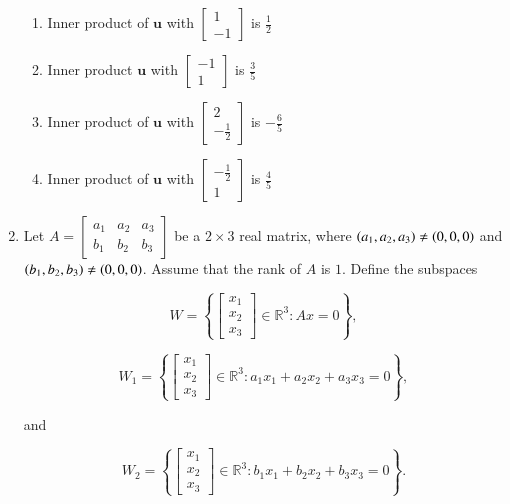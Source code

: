 \documentclass[journal]{IEEEtran}
\numberwithin{equation}{enumi}
\numberwithin{figure}{enumi}
\begin{document}
\begin{enumerate}
\begin{enumerate}[label=\brak{\Alph*}]
\item Inner product of $\mathbf{u}$ with $\begin{bmatrix} 1 \\ -1 \end{bmatrix}$ is $\frac{1}{2}$

\item Inner product $\mathbf{u}$ with $\begin{bmatrix} -1 \\ 1 \end{bmatrix}$ is $\frac{3}{5}$ 

\item Inner product of $\mathbf{u}$ with $\begin{bmatrix} 2 \\ -\frac{1}{2} \end{bmatrix}$ is $-\frac{6}{5}$

\item Inner product of $\mathbf{u}$ with $\begin{bmatrix} -\frac{1}{2} \\ 1 \end{bmatrix}$ is $\frac{4}{5}$
\end{enumerate}

\item Let $A = \begin{bmatrix} a_1 & a_2 & a_3 \\ b_1 & b_2 & b_3 \end{bmatrix}$ be a $2 \times 3$ real matrix, where $\left(a_1, a_2, a_3\right) \neq \left(0,0,0\right)$ and $\left(b_1, b_2, b_3\right) \neq \left(0,0,0\right)$. Assume that the rank of $A$ is $1$. Define the subspaces 

$$W = \left\{ \begin{bmatrix} x_1 \\ x_2 \\ x_3 \end{bmatrix} \in \mathbb{R}^3 : Ax = 0 \right\},$$

$$W_1 = \left\{ \begin{bmatrix} x_1 \\ x_2 \\ x_3 \end{bmatrix} \in \mathbb{R}^3 : a_1x_1 + a_2x_2 + a_3x_3 = 0 \right\},$$

and

$$W_2 = \left\{ \begin{bmatrix} x_1 \\ x_2 \\ x_3 \end{bmatrix} \in \mathbb{R}^3 : b_1x_1 + b_2x_2 + b_3x_3 = 0 \right\}.$$


\end{enumerate}
\end{document}
